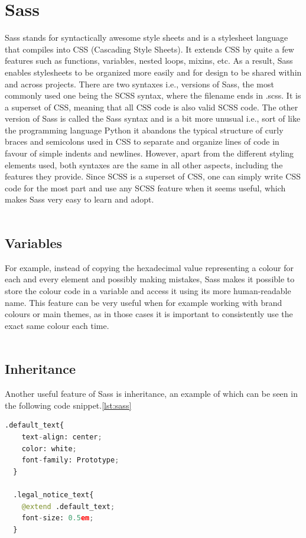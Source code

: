 \section{Sass}
Sass stands for syntactically awesome style sheets and is a stylesheet language that compiles into CSS (Cascading Style Sheets). It extends CSS by quite
a few features such as functions, variables, nested loops, mixins, etc. As a result, Sass enables stylesheets to be organized more easily and for design
to be shared within and across projects. There are two syntaxes i.e., versions of Sass, the most commonly used one being the SCSS syntax, where the
filename ends in .scss. It is a superset of CSS, meaning that all CSS code is also valid SCSS code. The other version of Sass is called the Sass syntax
and is a bit more unusual i.e., sort of like the programming language Python it abandons the typical structure of curly braces and semicolons used in CSS
to separate and organize lines of code in favour of simple indents and newlines. However, apart from the different styling elements used, both syntaxes
are the same in all other aspects, including the features they provide. Since SCSS is a superset of CSS, one can simply write CSS code for the most part
and use any SCSS feature when it seems useful, which makes Sass very easy to learn and adopt. \cite{SassFeatures}
\\
\\
\subsection{Variables}
For example, instead of copying the hexadecimal value representing a colour for each and every element and possibly making mistakes, Sass makes it possible
to store the colour code in a variable and access it using its more human-readable name. This feature can be very useful when for example working with brand
colours or main themes, as in those cases it is important to consistently use the exact same colour each time. \cite{SassFeatures}
\\
\\
\subsection{Inheritance}
Another useful feature of Sass is inheritance, an example of which can be seen in the following code snippet.\ref{lst:sass}

\begin{lstlisting}[language=Python,caption=Textstyling in Sass,label=lst:sass]
  .default_text{
    text-align: center;
    color: white;
    font-family: Prototype;
  }

  .legal_notice_text{
    @extend .default_text;
    font-size: 0.5em;
  }
\end{lstlisting}

